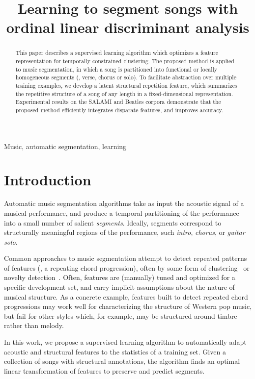 \documentclass{article}
\title{Learning to segment songs with ordinal linear discriminant analysis}
\begin{document}
%
\maketitle
%
\begin{abstract}
This paper describes a supervised learning algorithm which optimizes a feature representation for temporally constrained clustering. 
The proposed method is applied to music segmentation, in which a song is partitioned into functional or
locally homogeneous segments (\eg, verse, chorus or solo).  
To facilitate abstraction over multiple training examples, we develop a latent structural repetition feature, which summarizes the
repetitive structure of a song of any length in a fixed-dimensional representation.
Experimental results on the SALAMI and Beatles corpora demonstrate that the proposed method efficiently integrates disparate
features, and improves accuracy.
\end{abstract}
%
\begin{keywords}
Music, automatic segmentation, learning
\end{keywords}
%
\section{Introduction}
\label{sec:intro}

Automatic music segmentation algorithms take as input the acoustic signal of a musical performance, and produce a temporal
partitioning of the performance into a small number of salient \emph{segments}.  Ideally, segments correspond to structurally
meaningful regions of the performance, such \emph{intro}, \emph{chorus}, or \emph{guitar solo}.

Common approaches to music segmentation attempt to detect repeated patterns of features (\eg, a repeating chord progression),
often by some form of clustering~\cite{levy2008structural} or novelty detection~\cite{serra2012unsupervised}.  Often, features
are (manually) tuned and optimized for a specific development set, and carry implicit assumptions about the nature of musical 
structure.  As a concrete example, features built to detect repeated chord progressions may work well for characterizing the 
structure of Western pop music, but fail for other styles which, for example, may be structured around timbre rather than melody.

In this work, we propose a supervised learning algorithm to automatically adapt acoustic and structural features to the statistics
of a training set. Given a collection of songs with structural annotations, the algorithm finds an optimal linear transformation
of features to preserve and predict segments.
\end{document}
